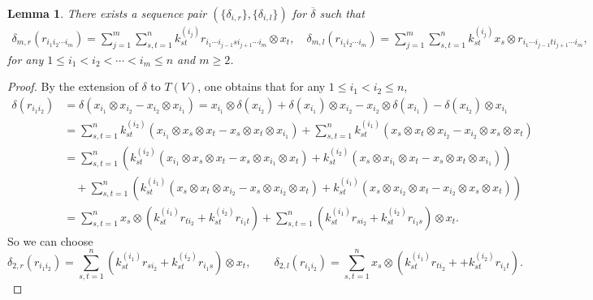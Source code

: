 \documentclass[a4paper,10pt]{amsart}
\newtheorem{lemma}[theorem]{Lemma}
\theoremstyle{definition}
\numberwithin{equation}{section}
\begin{document}
\begin{lemma}\label{lemma: delta_l delta_r for polynomial} There exists a sequence pair $(\{\delta_{i,r}\},\{\delta_{i,l}\})$ for $\overline{\delta}$  such that
\begin{align*}
\delta_{m,r}(r_{i_1i_2\cdots i_m})=\sum_{j=1}^m\sum_{s,t=1}^n k^{(i_{j})}_{st} r_{i_1\cdots i_{j-1}si_{j+1}\cdots i_m} \otimes x_t,\quad
\delta_{m,l}(r_{i_1i_2\cdots i_m})=\sum_{j=1}^m\sum_{s,t=1}^n k^{(i_{j})}_{st} x_s\otimes r_{i_1\cdots i_{j-1}ti_{j+1}\cdots i_m},
\end{align*}
for any $1\leq i_1<i_2<\cdots<i_m\leq n$ and $m\geq 2$.
\end{lemma}
\begin{proof} By the extension of $\delta$ to $T(V)$, one obtains that for any $1\leq i_1<i_2\leq n$,
\begin{align*}
\delta(r_{i_1i_2})&=\delta(x_{i_1}\otimes x_{i_2}-x_{i_2}\otimes x_{i_1})=x_{i_1}\otimes \delta(x_{i_2})+\delta(x_{i_1})\otimes x_{i_2}-x_{i_2}\otimes \delta(x_{i_1})-\delta(x_{i_2})\otimes x_{i_1}\\
&= \sum_{s,t=1}^n k_{st}^{(i_2)}( x_{i_1}\otimes x_s\otimes x_t- x_s\otimes x_t\otimes x_{i_1})+ \sum_{s,t=1}^n k_{st}^{(i_1)}(x_s\otimes x_t\otimes x_{i_2}-x_{i_2}\otimes  x_s\otimes x_t)\\
&=\sum_{s,t=1}^n \left( k_{st}^{(i_2)} \left(x_{i_1}\otimes x_s\otimes x_t-x_s\otimes x_{i_1}\otimes x_t\right)+k_{st}^{(i_2)} \left(x_s\otimes x_{i_1}\otimes x_t- x_s\otimes x_t\otimes x_{i_1}\right)\right)\\
&\quad+\sum_{s,t=1}^n \left(k_{st}^{(i_1)}\left(x_s\otimes x_t\otimes x_{i_2}-x_s\otimes x_{i_2}\otimes x_t\right)+k_{st}^{(i_1)}\left(x_s\otimes x_{i_2}\otimes x_t-x_{i_2}\otimes  x_s\otimes x_t\right)\right)\\
&=\sum_{s,t=1}^n x_s\otimes \left( k_{st}^{(i_1)}r_{ti_2}+k_{st}^{(i_2)} r_{i_1t}\right)+\sum_{s,t=1}^n \left(k_{st}^{(i_1)}r_{si_2}+k_{st}^{(i_2)}r_{i_1s} \right)\otimes x_t.
\end{align*}
So we can choose
$$
\delta_{2,r}(r_{i_1i_2})=\sum_{s,t=1}^n \left(k_{st}^{(i_1)}r_{si_2}+k_{st}^{(i_2)}r_{i_1s} \right)\otimes x_t,\qquad \delta_{2,l}(r_{i_1i_2})=\sum_{s,t=1}^n x_s\otimes \left( k_{st}^{(i_1)}r_{ti_2}++k_{st}^{(i_2)} r_{i_1t}\right).
$$


\end{proof}
\end{document}
